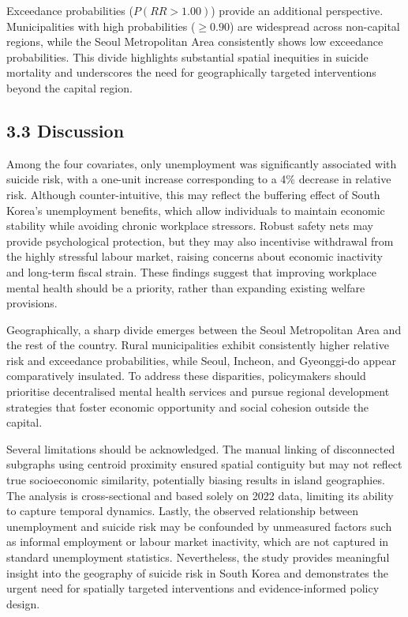 \documentclass[11pt]{article}
\begin{document}
	Exceedance probabilities ($P(RR > 1.00)$) provide an additional perspective. Municipalities with high probabilities ($\geq 0.90$) are widespread across non-capital regions, while the Seoul Metropolitan Area consistently shows low exceedance probabilities. This divide highlights substantial spatial inequities in suicide mortality and underscores the need for geographically targeted interventions beyond the capital region.
	
	\newpage
	\subsection*{3.3 Discussion}
	
	Among the four covariates, only unemployment was significantly associated with suicide risk, with a one-unit increase corresponding to a 4\% decrease in relative risk. Although counter-intuitive, this may reflect the buffering effect of South Korea's unemployment benefits, which allow individuals to maintain economic stability while avoiding chronic workplace stressors. Robust safety nets may provide psychological protection, but they may also incentivise withdrawal from the highly stressful labour market, raising concerns about economic inactivity and long-term fiscal strain. These findings suggest that improving workplace mental health should be a priority, rather than expanding existing welfare provisions.

	Geographically, a sharp divide emerges between the Seoul Metropolitan Area and the rest of the country. Rural municipalities exhibit consistently higher relative risk and exceedance probabilities, while Seoul, Incheon, and Gyeonggi-do appear comparatively insulated. To address these disparities, policymakers should prioritise decentralised mental health services and pursue regional development strategies that foster economic opportunity and social cohesion outside the capital.
	
	Several limitations should be acknowledged. The manual linking of disconnected subgraphs using centroid proximity ensured spatial contiguity but may not reflect true socioeconomic similarity, potentially biasing results in island geographies. The analysis is cross-sectional and based solely on 2022 data, limiting its ability to capture temporal dynamics. Lastly, the observed relationship between unemployment and suicide risk may be confounded by unmeasured factors such as informal employment or labour market inactivity, which are not captured in standard unemployment statistics. Nevertheless, the study provides meaningful insight into the geography of suicide risk in South Korea and demonstrates the urgent need for spatially targeted interventions and evidence-informed policy design.
	
\end{document}
